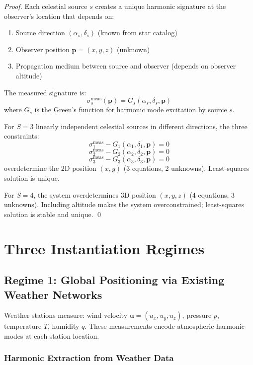\documentclass[11pt,twocolumn,a4paper]{article}
\theoremstyle{definition}
\begin{document}
\begin{proof}
Each celestial source $s$ creates a unique harmonic signature at the observer's location that depends on:
\begin{enumerate}[nosep]
\item Source direction $(\alpha_s, \delta_s)$ (known from star catalog)
\item Observer position $\mathbf{p} = (x, y, z)$ (unknown)
\item Propagation medium between source and observer (depends on observer altitude)
\end{enumerate}

The measured signature is:
\[
\sigma_s^{\text{meas}}(\mathbf{p}) = G_s(\alpha_s, \delta_s, \mathbf{p})
\]
where $G_s$ is the Green's function for harmonic mode excitation by source $s$.

For $S = 3$ linearly independent celestial sources in different directions, the three constraints:
\[
\sigma_1^{\text{meas}} - G_1(\alpha_1, \delta_1, \mathbf{p}) = 0
\]
\[
\sigma_2^{\text{meas}} - G_2(\alpha_2, \delta_2, \mathbf{p}) = 0
\]
\[
\sigma_3^{\text{meas}} - G_3(\alpha_3, \delta_3, \mathbf{p}) = 0
\]
overdetermine the 2D position $(x, y)$ (3 equations, 2 unknowns). Least-squares solution is unique.

For $S = 4$, the system overdetermines 3D position $(x, y, z)$ (4 equations, 3 unknowns). Including altitude makes the system overconstrained; least-squares solution is stable and unique. \qed
\end{proof}

\section{Three Instantiation Regimes}
\label{sec:instantiations}

\subsection{Regime 1: Global Positioning via Existing Weather Networks}

Weather stations measure: wind velocity $\mathbf{u} = (u_x, u_y, u_z)$, pressure $p$, temperature $T$, humidity $q$. These measurements encode atmospheric harmonic modes at each station location.

\subsubsection{Harmonic Extraction from Weather Data}
\end{document}
